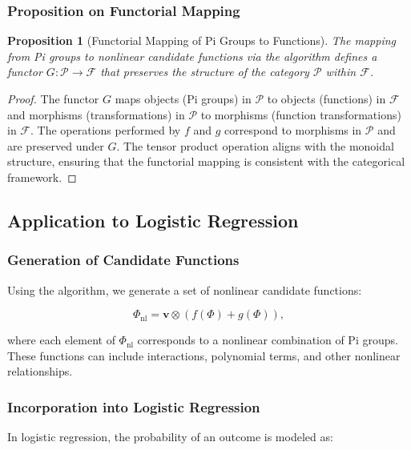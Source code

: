 \documentclass{article}
\newtheorem{proposition}{Proposition}[section]
\theoremstyle{definition}
\theoremstyle{remark}
\begin{document}
\subsubsection{Proposition on Functorial Mapping}

\begin{proposition}[Functorial Mapping of Pi Groups to Functions]
	The mapping from Pi groups to nonlinear candidate functions via the algorithm defines a functor $G: \mathcal{P} \rightarrow \mathcal{F}$ that preserves the structure of the category $\mathcal{P}$ within $\mathcal{F}$.
\end{proposition}

\begin{proof}
	The functor $G$ maps objects (Pi groups) in $\mathcal{P}$ to objects (functions) in $\mathcal{F}$ and morphisms (transformations) in $\mathcal{P}$ to morphisms (function transformations) in $\mathcal{F}$. The operations performed by $f$ and $g$ correspond to morphisms in $\mathcal{P}$ and are preserved under $G$. The tensor product operation aligns with the monoidal structure, ensuring that the functorial mapping is consistent with the categorical framework.
\end{proof}

\subsection{Application to Logistic Regression}

\subsubsection{Generation of Candidate Functions}

Using the algorithm, we generate a set of nonlinear candidate functions:

\[
\Phi_{\text{nl}} = \mathbf{v} \otimes \left( f(\Phi) + g(\Phi) \right),
\]

where each element of $\Phi_{\text{nl}}$ corresponds to a nonlinear combination of Pi groups. These functions can include interactions, polynomial terms, and other nonlinear relationships.

\subsubsection{Incorporation into Logistic Regression}

In logistic regression, the probability of an outcome is modeled as:
\end{document}
